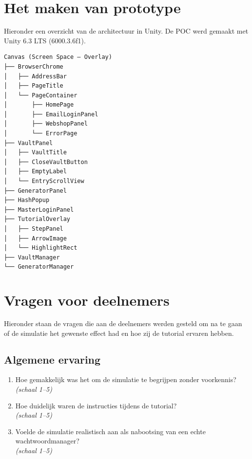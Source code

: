 \section{Het maken van prototype}

Hieronder een overzicht van de architectuur in Unity. De POC werd gemaakt met Unity 6.3 LTS (6000.3.6f1). 

\begin{verbatim}
Canvas (Screen Space – Overlay)
├── BrowserChrome
│   ├── AddressBar
│   ├── PageTitle
│   └── PageContainer
│       ├── HomePage
│       ├── EmailLoginPanel
│       ├── WebshopPanel
│       └── ErrorPage
├── VaultPanel
│   ├── VaultTitle
│   ├── CloseVaultButton
│   ├── EmptyLabel
│   └── EntryScrollView
├── GeneratorPanel
├── HashPopup
├── MasterLoginPanel
├── TutorialOverlay
│   ├── StepPanel
│   ├── ArrowImage
│   └── HighlightRect
├── VaultManager
└── GeneratorManager
\end{verbatim}

\section{Vragen voor deelnemers}

Hieronder staan de vragen die aan de deelnemers werden gesteld om na te gaan of de simulatie het gewenste effect had en hoe zij de tutorial ervaren hebben.

\subsection{Algemene ervaring}
\begin{enumerate}
    \item Hoe gemakkelijk was het om de simulatie te begrijpen zonder voorkennis?\\
    \textit{(schaal 1--5)}
    
    \item Hoe duidelijk waren de instructies tijdens de tutorial?\\
    \textit{(schaal 1--5)}
    
    \item Voelde de simulatie realistisch aan als nabootsing van een echte wachtwoordmanager?\\
    \textit{(schaal 1--5)}
\end{enumerate}

